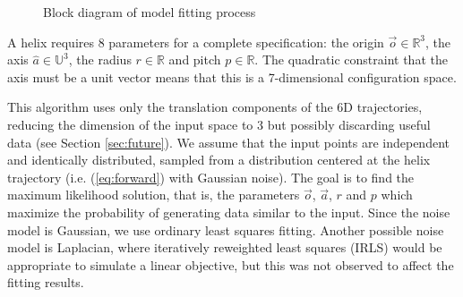 \documentclass[letterpaper, 10 pt, conference]{ieeeconf}  %
\def\xvec{\vec}          \def\xvecstr{with an arrow}
\def\xuv{\hat}           \def\xuvstr{with a caret}
\def\xse{\bm}            \def\xsestr{in boldface}
\begin{document}
\begin{figure}[ht]
  \centering
  \caption{Block diagram of model fitting process}
  \label{fig:block-algo}
\end{figure}

A helix requires 8 parameters for a complete specification: the origin $\xvec{o} \in \mathbb{R}^3$, the axis $\xuv{a} \in \mathbb{U}^3$, the radius $r \in \mathbb{R}$ and pitch $p \in \mathbb{R}$. The quadratic constraint that the axis must be a unit vector means that this is a 7-dimensional configuration space.

This algorithm uses only the translation components of the 6D trajectories, reducing the dimension of the input space to 3 but possibly discarding useful data (see Section \ref{sec:future}). We assume that the input points are independent and identically distributed, sampled from a distribution centered at the helix trajectory (i.e. (\ref{eq:forward}) with Gaussian noise). The goal is to find the maximum likelihood solution, that is, the parameters $\xvec{o}$, $\xvec{a}$, $r$ and $p$ which maximize the probability of generating data similar to the input. Since the noise model is Gaussian, we use ordinary least squares fitting. Another possible noise model is Laplacian, where iteratively reweighted least squares (IRLS) would be appropriate to simulate a linear objective, but this was not observed to affect the fitting results.
\end{document}
